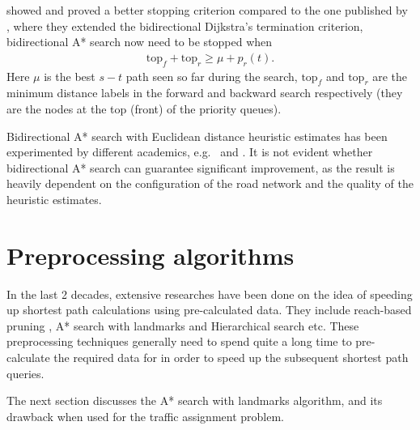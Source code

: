 \citet{GoldbergEPP} showed and proved a better stopping criterion compared to the one published by \citet{Pohl},
where they extended the bidirectional Dijkstra's termination criterion,
bidirectional A* search now need to be stopped when
\begin{align}
    \text{top}_f + \text{top}_r \geq \mu + p_r(t).
\end{align}
Here $\mu$ is the best $s-t$ path seen so far during the search,
$\text{top}_f$ and $\text{top}_r$ are the minimum distance labels in the forward and backward search respectively (they are the nodes at the top (front) of the priority queues).

Bidirectional A* search with Euclidean distance heuristic estimates has been experimented by different academics, e.g.\ \citet{Klunder} and \citet{Goldberg05}.
It is not evident whether bidirectional A* search can guarantee significant improvement,
as the result is heavily dependent on the configuration of the road network and the quality of the heuristic estimates.

\section{Preprocessing algorithms}
In the last 2 decades,
extensive researches have been done on the idea of speeding up shortest path calculations using pre-calculated data.
They include reach-based pruning \citep{Goldberg}, A* search with landmarks \citep{GoldbergLandmarks} and Hierarchical search \citep{Ertl1998, Pearson} etc.
These preprocessing techniques generally need to spend quite a long time to pre-calculate the required data for in order to speed up the subsequent shortest path queries.

The next section discusses the A* search with landmarks algorithm,
and its drawback when used for the traffic assignment problem.

